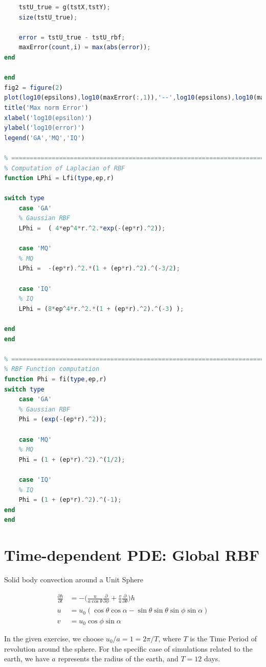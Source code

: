 \documentclass[11pt]{article}
\begin{document}
\begin{lstlisting}[language=octave]
%     fprintf('tstU_true\n')
    tstU_true = g(tstX,tstY);
    size(tstU_true);
    
    error = tstU_true - tstU_rbf;
    maxError(count,i) = max(abs(error));
end

end
fig2 = figure(2)
plot(log10(epsilons),log10(maxError(:,1)),'--',log10(epsilons),log10(maxError(:,2)),'-.', log10(epsilons),log10(maxError(:,3)),'-' )
title('Max norm Error')
xlabel('log10(epsilon)')
ylabel('log10(error)')
legend('GA','MQ','IQ')

% ==============================================================================
% Computation of Laplacian of RBF
function LPhi = Lfi(type,ep,r)

switch type
    case 'GA'
    % Gaussian RBF
    LPhi =  ( 4*ep^4*r.^2.*exp(-(ep*r).^2));      
    
    case 'MQ'
    % MQ
    LPhi =  -(ep*r).^2.*(1 + (ep*r).^2).^(-3/2);  
        
    case 'IQ'
    % IQ
    LPhi = (8*ep^4*r.^2.*(1 + (ep*r).^2).^(-3) ); 

end
end

% ==============================================================================
% RBF Function computation
function Phi = fi(type,ep,r)
switch type
    case 'GA'
    % Gaussian RBF
    Phi = (exp(-(ep*r).^2));
    
    case 'MQ'
    % MQ
    Phi = (1 + (ep*r).^2).^(1/2);    
        
    case 'IQ'
    % IQ
    Phi = (1 + (ep*r).^2).^(-1);    
end
end
\end{lstlisting}


\section{Time-dependent PDE: Global RBF}
Solid body convection around a Unit Sphere

\begin{align}
\frac{\partial h}{\partial t} &= -\big( \frac{u}{a \cos\theta} \frac{\partial}{\partial \phi} + \frac{v}{a} \frac{\partial}{\partial\theta} \big) h \\
u &= u_0 (\cos\theta \cos\alpha - \sin\theta \sin\theta \sin\phi \sin\alpha)\\
v &= u_0 \cos\phi \sin\alpha
\end{align}

In the given exercise, we choose $u_0/a = 1 = 2\pi /T$, where $T$ is the Time Period of revolution around the sphere. 
For the specific case of simulations related to the earth, we have $a$ represents the radius of the earth, and $T = 12$ days.
\end{document}
